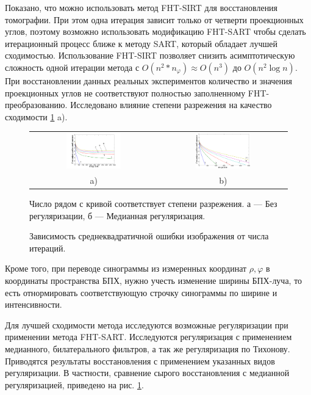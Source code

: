 Показано, что можно использовать метод FHT-SIRT для восстановления томографии.
При этом одна итерация зависит только от четверти проекционных углов, поэтому возможно использовать модификацию FHT-SART чтобы сделать итерационный процесс ближе к методу SART, который обладает лучшей сходимостью.
Использование FHT-SIRT позволяет снизить асимптотическую сложность одной итерации метода с $O(n^2 * n_\varphi) \approx O(n^3)$ до $O(n^2 \log n)$.
При восстановлении данных реальных экспериментов количество и значения проекционных углов не соответствуют полностью заполненному FHT-преобразованию. 
Исследовано влияние степени разрежения на качество сходимости \ref{fig:conv_all} a).

\begin{figure}
\centering
\begin{tabular}{@{}c@{}c}
    \includegraphics[width=0.45\textwidth]{Dissertation/images/part1_img/raw}
&
    \includegraphics[width=0.45\textwidth]{Dissertation/images/part1_img/medk}
\\
   \small a) & \small b)
\end{tabular}
  \caption{Зависимость среднеквадратичной ошибки изображения от числа итераций.}
Число рядом с кривой соответствует степени разрежения. а --- Без регуляризации, б --- Медианная регуляризация.
\label{fig:conv_all}
\end{figure}

Кроме того, при переводе синограммы из измеренных координат $\rho, \varphi$ в координаты пространства БПХ, нужно учесть изменение ширины БПХ-луча, то есть отнормировать соответствующую строчку синограммы по ширине и интенсивности.

Для лучшей сходимости метода исследуются возможные регуляризации при применении метода FHT-SART.
Исследуются регуляризация с применением медианного, билатерального фильтров, а так же регуляризация по Тихонову.
Приводятся результаты восстановления с применением указанных видов регуляризации.
В частности, сравнение сырого восстановления с медианной регуляризацией, приведено на рис. \ref{fig:conv_all}.


